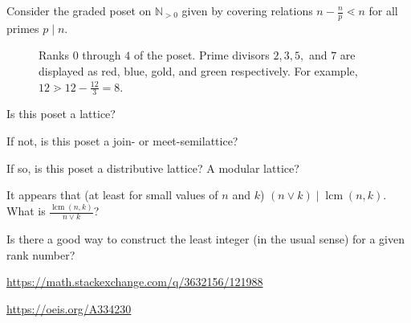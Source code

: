 \documentclass{article}
\begin{document}
Consider the graded poset on $\mathbb{N}_{>0}$ given by covering relations
$\displaystyle n - \frac{n}{p} \lessdot n$ for all primes $p \mid n$.
\begin{figure}[ht!]
  \centering
  \caption{Ranks $0$ through $4$ of the poset.
  Prime divisors $2, 3, 5,$ and $7$ are displayed as red, blue, gold, and green
  respectively.
  For example, $\displaystyle 12 \gtrdot 12 - \frac{12}{3} = 8$.}
\end{figure}

\begin{question}
  Is this poset a lattice?
\end{question}

\begin{related}
  \item If not, is this poset a join- or meet-semilattice?
  \item If so, is this poset a distributive lattice? A modular lattice?
  \item It appears that (at least for small values of $n$ and $k$)
    $(n \vee k) \mid \operatorname{lcm}(n,k)$.
    What is $\displaystyle \frac{\operatorname{lcm}(n,k)}{n \vee k}$?
  \item Is there a good way to construct the least integer (in the usual sense)
    for a given rank number?
\end{related}

\begin{references}
  \item \url{https://math.stackexchange.com/q/3632156/121988}
  \item \url{https://oeis.org/A334230}
\end{references}
\end{document}
